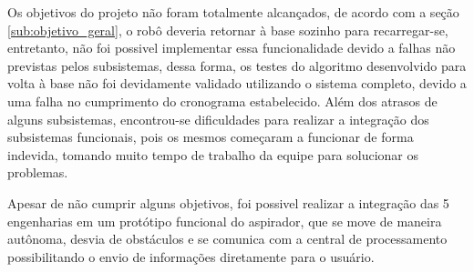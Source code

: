 
Os objetivos do projeto não foram totalmente alcançados, de acordo com a seção \ref{sub:objetivo_geral}, o robô deveria retornar à base sozinho para recarregar-se, entretanto, não foi possivel implementar essa funcionalidade devido a falhas não previstas pelos subsistemas, dessa forma, os testes do algoritmo desenvolvido para volta à base não foi devidamente validado utilizando o sistema completo, devido a uma falha no cumprimento do cronograma estabelecido. Além dos atrasos de alguns subsistemas, encontrou-se dificuldades para realizar a integração dos subsistemas funcionais, pois os mesmos começaram a funcionar de forma indevida, tomando muito tempo de trabalho da equipe para solucionar os problemas.

Apesar de não cumprir alguns objetivos, foi possivel realizar a integração das 5 engenharias em um protótipo funcional do aspirador, que se move de maneira autônoma, desvia de obstáculos e se comunica com a central de processamento possibilitando o envio de informações diretamente para o usuário.

